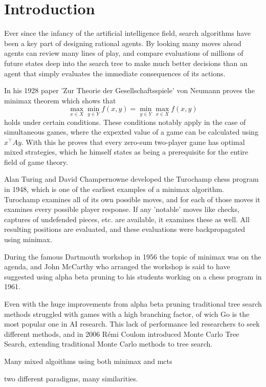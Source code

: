\section{Introduction}

Ever since the infancy of the artificial intelligence field, search
algorithms have been a key part of designing rational agents. By
looking many moves ahead agents can review many lines of play, and
compare evaluations of millions of future states deep into the search
tree to make much better decisions than an agent that simply evaluates
the immediate consequences of its actions.

In his 1928 paper 'Zur Theorie der Gesellschaftsspiele' von Neumann
proves the minimax theorem which shows that
\begin{equation}
    \max_{x\in X}\min_{y\in Y} f(x, y) = \min_{y\in Y}\max_{x\in X} f(x, y)   
\end{equation}
holds under certain conditions. These conditions notably apply in the
case of simultaneous games, where the expexted value of a game can be
calculated using $x^\intercal Ay$. With this he proves that every zero-sum two-player game has
optimal mixed strategies, which he himself states as being a prerequisite
for the entire field of game theory. 

Alan Turing and David Champernowne developed the Turochamp chess program
in 1948, which is one of the earliest examples of a minimax algorithm.
Turochamp examines all of its own possible moves, and for each of those
moves it examines every possible player response. If any 'notable' moves
like checks, captures of undefended pieces, etc. are available, it
examines these as well. All resulting positions are evaluated, and these
evaluations were backpropagated using minimax. 

During the famous Dartmouth workshop in 1956 the topic of minimax was
on the agenda, and John McCarthy who arranged the workshop is said to 
have suggested using alpha beta pruning to his students working on a 
chess program in 1961.

Even with the huge improvements from alpha beta pruning traditional
tree search methods struggled with games with a high branching factor,
of wich Go is the most popular one in AI research. This lack of
performance led researchers to seek different methods, and in 2006 
Rémi Coulom introduced Monte Carlo Tree Search, extending
traditional Monte Carlo methods to tree search.

Many mixed algoithms using both minimax and mcts 

two different paradigms, many similarities.
